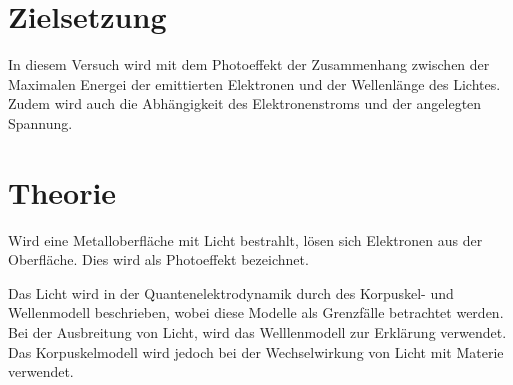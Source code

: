 \section{Zielsetzung}
In diesem Versuch wird mit dem Photoeffekt der Zusammenhang zwischen der Maximalen Energei der emittierten Elektronen
und der Wellenlänge des Lichtes.
Zudem wird auch die Abhängigkeit des Elektronenstroms und der angelegten Spannung.

\section{Theorie}
\label{sec:Theorie}

Wird eine Metalloberfläche mit Licht bestrahlt, lösen sich Elektronen aus der Oberfläche.
Dies wird als Photoeffekt bezeichnet.

Das Licht wird in der Quantenelektrodynamik durch des Korpuskel- und Wellenmodell beschrieben, wobei diese Modelle als Grenzfälle betrachtet werden.
Bei der Ausbreitung von Licht, wird das Welllenmodell zur Erklärung verwendet.
Das Korpuskelmodell wird jedoch bei der Wechselwirkung von Licht mit Materie verwendet.
